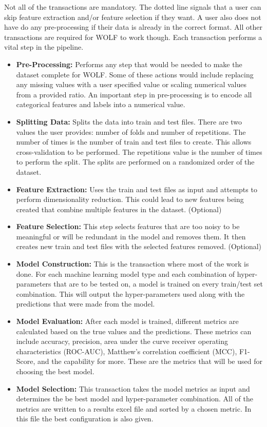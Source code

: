 Not all of the transactions are mandatory. The dotted line signals that a user can skip feature extraction and/or feature selection if they want. A user also does not have do any pre-processing if their data is already in the correct format. All other transactions are required for WOLF to work though. Each transaction performs a vital step in the pipeline.
\begin{itemize}
	\item \textbf{Pre-Processing:} Performs any step that would be needed to make the dataset complete for WOLF. Some of these actions would include replacing any missing values with a user specified value or scaling numerical values from a provided ratio. An important step in pre-processing is to encode all categorical features and labels into a numerical value.
	\item \textbf{Splitting Data:} Splits the data into train and test files. There are two values the user provides: number of folds and number of repetitions. The number of times is the number of train and test files to create. This allows cross-validation to be performed. The repetitions value is the number of times to perform the split. The splits are performed on a randomized order of the dataset.
	\item \textbf{Feature Extraction:} Uses the train and test files as input and attempts to perform dimensionality reduction. This could lead to new features being created that combine multiple features in the dataset. (Optional)
	\item \textbf{Feature Selection:} This step selects features that are too noisy to be meaningful or will be redundant in the model and removes them. It then creates new train and test files with the selected features removed. (Optional)
	\item \textbf{Model Construction:} This is the transaction where most of the work is done. For each machine learning model type and each combination of hyper-parameters that are to be tested on, a model is trained on every train/test set combination. This will output the hyper-parameters used along with the predictions that were made from the model.
	\item \textbf{Model Evaluation:} After each model is trained, different metrics are calculated based on the true values and the predictions. These metrics can include accuracy, precision, area under the curve receiver operating characteristics (ROC-AUC), Matthew's correlation coefficient (MCC), F1-Score, and the capability for more. These are the metrics that will be used for choosing the best model.
	\item \textbf{Model Selection:} This transaction takes the model metrics as input and determines the be best model and hyper-parameter combination. All of the metrics are written to a results excel file and sorted by a chosen metric. In this file the best configuration is also given.
\end{itemize}

